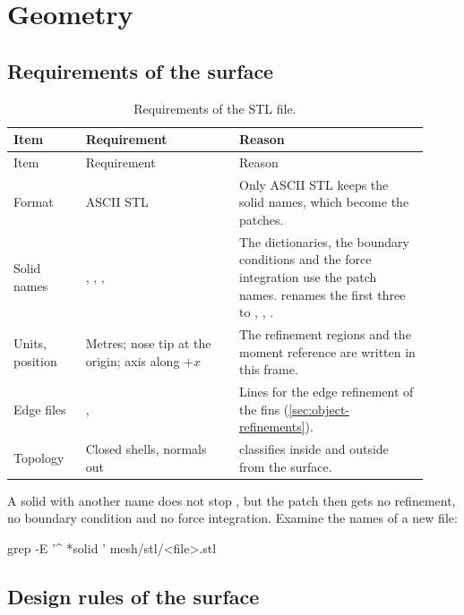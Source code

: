 \chapter{Geometry}\label{ch:geometry}

\section{Requirements of the surface}\label{sec:geometry-requirements}

\begin{longtable}{@{}P{0.16\linewidth} P{0.34\linewidth} P{0.42\linewidth}@{}}
\caption{Requirements of the STL file.}\label{tab:stl-req}\\
\toprule
Item & Requirement & Reason \\
\midrule
\endfirsthead
\toprule
Item & Requirement & Reason \\
\midrule
\endhead
Format & ASCII STL & Only ASCII STL keeps the solid names, which become the patches. \\
Solid names & , , ,  & The dictionaries, the boundary conditions and the force integration use the patch names.  renames the first three to , , . \\
Units, position & Metres; nose tip at the origin; axis along $+x$ & The refinement regions and the moment reference are written in this frame. \\
Edge files & ,  & Lines for the edge refinement of the fins (\cref{sec:object-refinements}). \\
Topology & Closed shells, normals out &  classifies inside and outside from the surface. \\
\bottomrule
\end{longtable}

A solid with another name does not stop , but the patch then gets no
refinement, no boundary condition and no force integration. Examine the names of a new
file:
\begin{shell}
grep -E '^ *solid ' mesh/stl/<file>.stl
\end{shell}

\section{Design rules of the surface}\label{sec:surface-rules}

